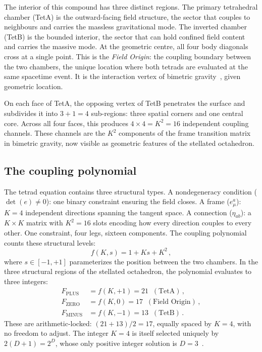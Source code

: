 \documentclass[twocolumn]{iopjournal}
\newcommand{\FZERO}{F_{\mathrm{ZERO}}}
\newcommand{\FPLUS}{F_{\mathrm{PLUS}}}
\newcommand{\FMINUS}{F_{\mathrm{MINUS}}}
\begin{document}
The interior of this compound has three distinct regions.
The primary tetrahedral chamber (TetA) is the outward-facing
field structure, the sector that couples to neighbours and
carries the massless gravitational mode.
The inverted chamber (TetB) is the bounded interior, the
sector that can hold confined field content and carries the
massive mode.
At the geometric centre, all four body diagonals cross at a
single point.
This is the \emph{Field Origin}: the coupling boundary between
the two chambers, the unique location where both tetrads are
evaluated at the same spacetime event.
It is the interaction vertex of bimetric
gravity~\cite{hassanrosen2012}, given geometric location.

On each face of TetA, the opposing vertex of TetB
penetrates the surface and subdivides it into $3 + 1 = 4$
sub-regions: three spatial corners and one central core.
Across all four faces, this produces $4 \times 4 = K^2 = 16$
independent coupling channels.
These channels are the $K^2$ components of the frame
transition matrix in bimetric gravity, now visible as
geometric features of the stellated octahedron.

\subsection*{The coupling polynomial}

The tetrad equation contains three structural types. A nondegeneracy condition ($\det(e) \neq 0$): one
binary constraint ensuring the field closes.
A frame ($e^{a}_{\mu}$): $K = 4$ independent directions spanning
the tangent space. A connection ($\eta_{ab}$): a $K \times K$
matrix with $K^2 = 16$ slots encoding how every direction
couples to every other.
One constraint, four legs, sixteen components.
The coupling polynomial counts these structural levels:
\begin{equation}
  f(K, s) = 1 + Ks + K^2\,,
  \label{eq:poly}
\end{equation}
where $s \in [-1, +1]$ parameterizes the position between the
two chambers. In the three structural regions of the stellated
octahedron, the polynomial evaluates to three integers:
\begin{align}
  \FPLUS  &= f(K, {+}1) = 21 \;\;(\text{TetA})\,, \nonumber\\
  \FZERO  &= f(K, 0)    = 17 \;\;(\text{Field Origin})\,, \nonumber\\
  \FMINUS &= f(K, {-}1) = 13 \;\;(\text{TetB})\,.
  \label{eq:landmarks}
\end{align}
These are arithmetic-locked: $(21 + 13)/2 = 17$, equally spaced
by $K = 4$, with no freedom to adjust.
The integer $K = 4$ is itself selected uniquely by
$2(D{+}1) = 2^D$, whose only positive integer solution is
$D = 3$~\cite{nelson2025a}.
\end{document}

